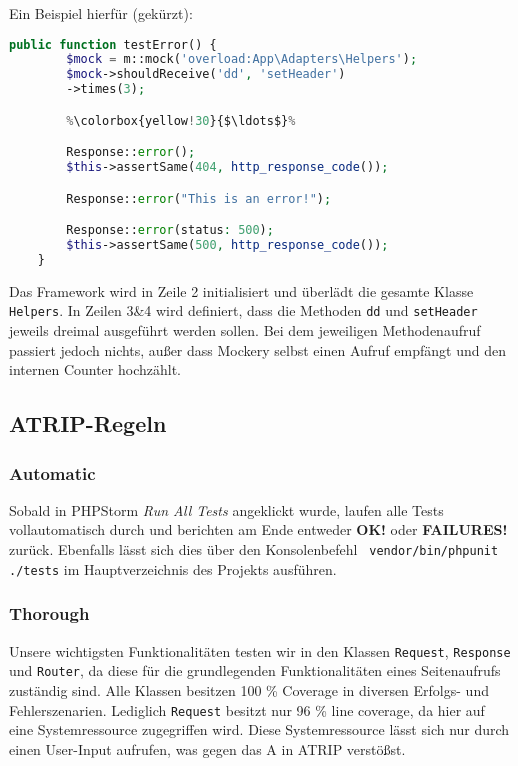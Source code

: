 \documentclass[12pt,a4paper,titlepage,ngerman,pdftex]{report}
\begin{document}
    Ein Beispiel hierfür (gekürzt):
    \begin{lstlisting}[language=php,label={lst:mockery},escapechar=\%]
    public function testError() {
        $mock = m::mock('overload:App\Adapters\Helpers');
        $mock->shouldReceive('dd', 'setHeader')
        ->times(3);

        %\colorbox{yellow!30}{$\ldots$}%

        Response::error();
        $this->assertSame(404, http_response_code());

        Response::error("This is an error!");

        Response::error(status: 500);
        $this->assertSame(500, http_response_code());
    }
    \end{lstlisting}

    Das Framework wird in Zeile 2 initialisiert und überlädt die gesamte Klasse \verb|Helpers|.
    In Zeilen 3\&4 wird definiert, dass die Methoden \verb|dd| und \verb|setHeader| jeweils dreimal ausgeführt werden sollen.
    Bei dem jeweiligen Methodenaufruf passiert jedoch nichts, außer dass Mockery selbst einen Aufruf empfängt und den internen Counter hochzählt.

    \subsection{ATRIP-Regeln}
    \label{subsec:atrip-regeln}

    \subsubsection{Automatic}
    Sobald in PHPStorm \textit{Run All Tests} angeklickt wurde, laufen alle Tests vollautomatisch durch und berichten am Ende entweder \textbf{OK!} oder \textbf{FAILURES!} zurück.
    Ebenfalls lässt sich dies über den Konsolenbefehl \verb| vendor/bin/phpunit ./tests| im Hauptverzeichnis des Projekts ausführen.

    \subsubsection{Thorough}
    Unsere wichtigsten Funktionalitäten testen wir in den Klassen \verb|Request|, \verb|Response| und \verb|Router|, da diese für die grundlegenden Funktionalitäten eines Seitenaufrufs zuständig sind.
    Alle Klassen besitzen 100 \% Coverage in diversen Erfolgs- und Fehlerszenarien. Lediglich \verb|Request| besitzt nur 96 \% line coverage, da hier auf eine Systemressource zugegriffen wird.
    Diese Systemressource lässt sich nur durch einen User-Input aufrufen, was gegen das A in ATRIP verstößst.
\end{document}

